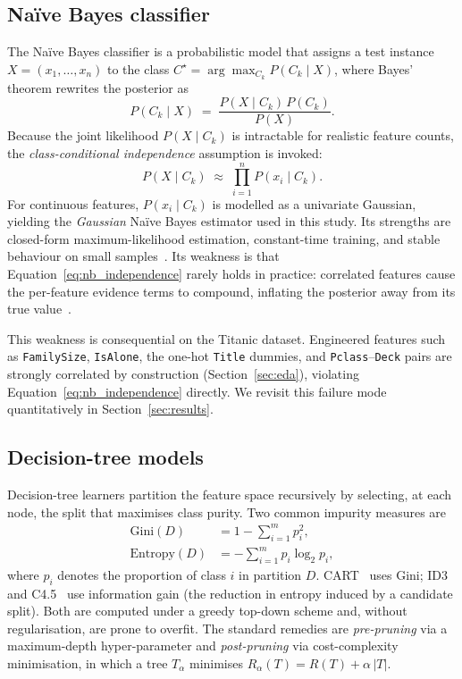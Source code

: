 \documentclass[10pt,a4paper,twocolumn]{article}
\begin{document}
\subsection{Na\"ive Bayes classifier}
The Na\"ive Bayes classifier is a probabilistic model that assigns a test instance
$X = (x_1,\dots,x_n)$ to the class $C^\star = \arg\max_{C_k} P(C_k\mid X)$, where Bayes'
theorem rewrites the posterior as
\begin{equation}\label{eq:bayes}
P(C_k \mid X) \; = \; \frac{P(X \mid C_k)\, P(C_k)}{P(X)} .
\end{equation}
Because the joint likelihood $P(X\mid C_k)$ is intractable for realistic feature counts,
the \emph{class-conditional independence} assumption is invoked:
\begin{equation}\label{eq:nb_independence}
P(X \mid C_k) \; \approx \; \prod_{i=1}^n P(x_i \mid C_k) .
\end{equation}
For continuous features, $P(x_i\mid C_k)$ is modelled as a univariate Gaussian, yielding
the \emph{Gaussian} Na\"ive Bayes estimator used in this study. Its strengths are
closed-form maximum-likelihood estimation, constant-time training, and stable behaviour
on small samples~\cite{mitchell1997ml}. Its weakness is that
Equation~\eqref{eq:nb_independence} rarely holds in practice: correlated features cause
the per-feature evidence terms to compound, inflating the posterior away from its true
value~\cite{han2011data}.

This weakness is consequential on the Titanic dataset. Engineered features such as
\texttt{FamilySize}, \texttt{IsAlone}, the one-hot \texttt{Title} dummies, and
\texttt{Pclass}--\texttt{Deck} pairs are strongly correlated by construction
(Section~\ref{sec:eda}), violating Equation~\eqref{eq:nb_independence} directly. We
revisit this failure mode quantitatively in Section~\ref{sec:results}.

\subsection{Decision-tree models}
Decision-tree learners partition the feature space recursively by selecting, at each
node, the split that maximises class purity. Two common impurity measures are
\begin{align}
\text{Gini}(D)    &= 1 - \sum_{i=1}^{m} p_i^2, \label{eq:gini}\\
\text{Entropy}(D) &= -\sum_{i=1}^{m} p_i \log_2 p_i, \label{eq:entropy}
\end{align}
where $p_i$ denotes the proportion of class $i$ in partition $D$.
CART~\cite{breiman1984} uses Gini; ID3 and C4.5~\cite{quinlan1986} use information gain
(the reduction in entropy induced by a candidate split). Both are computed under a
greedy top-down scheme and, without regularisation, are prone to overfit. The standard
remedies are \emph{pre-pruning} via a maximum-depth hyper-parameter and
\emph{post-pruning} via cost-complexity minimisation, in which a tree $T_\alpha$
minimises $R_\alpha(T) = R(T) + \alpha\,|T|$.
\end{document}
